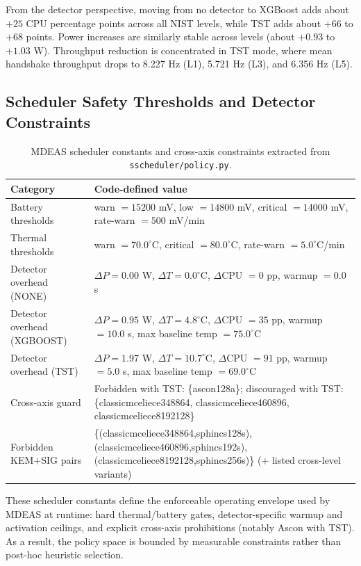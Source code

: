 From the detector perspective, moving from no detector to XGBoost adds about $+25$ CPU percentage points across all NIST levels, while TST adds about $+66$ to $+68$ points. Power increases are similarly stable across levels (about $+0.93$ to $+1.03$ W). Throughput reduction is concentrated in TST mode, where mean handshake throughput drops to 8.227 Hz (L1), 5.721 Hz (L3), and 6.356 Hz (L5).

\subsection{Scheduler Safety Thresholds and Detector Constraints}
\begin{table}[t]
\centering
\caption{MDEAS scheduler constants and cross-axis constraints extracted from \texttt{sscheduler/policy.py}.}
\footnotesize
\setlength{\tabcolsep}{4pt}
\begin{tabular}{@{}ll@{}}\toprule
Category & Code-defined value \\ \midrule
Battery thresholds & warn $=15200$ mV, low $=14800$ mV, critical $=14000$ mV, rate-warn $=500$ mV/min \\
Thermal thresholds & warn $=70.0^{\circ}$C, critical $=80.0^{\circ}$C, rate-warn $=5.0^{\circ}$C/min \\
Detector overhead (NONE) & $\Delta P=0.00$ W, $\Delta T=0.0^{\circ}$C, $\Delta$CPU $=0$ pp, warmup $=0.0$ s \\
Detector overhead (XGBOOST) & $\Delta P=0.95$ W, $\Delta T=4.8^{\circ}$C, $\Delta$CPU $=35$ pp, warmup $=10.0$ s, max baseline temp $=75.0^{\circ}$C \\
Detector overhead (TST) & $\Delta P=1.97$ W, $\Delta T=10.7^{\circ}$C, $\Delta$CPU $=91$ pp, warmup $=5.0$ s, max baseline temp $=69.0^{\circ}$C \\
Cross-axis guard & Forbidden with TST: \{ascon128a\}; discouraged with TST: \{classicmceliece348864, classicmceliece460896, classicmceliece8192128\} \\
Forbidden KEM+SIG pairs & \{(classicmceliece348864,sphincs128s), (classicmceliece460896,sphincs192s), (classicmceliece8192128,sphincs256s)\} (+ listed cross-level variants) \\
\bottomrule\end{tabular}
\label{tab:scheduler-thresholds-constraints}
\end{table}

These scheduler constants define the enforceable operating envelope used by MDEAS at runtime: hard thermal/battery gates, detector-specific warmup and activation ceilings, and explicit cross-axis prohibitions (notably Ascon with TST). As a result, the policy space is bounded by measurable constraints rather than post-hoc heuristic selection.

\clearpage
